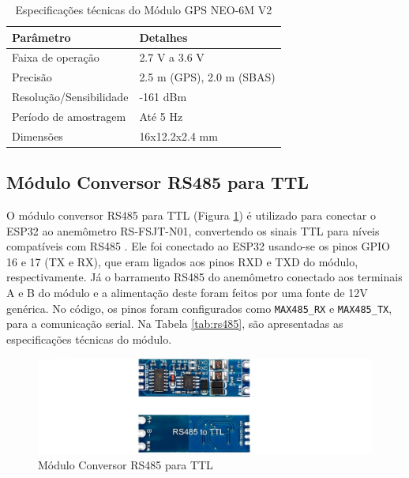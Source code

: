 \begin{table}[!htb]
  \caption{Especificações técnicas do Módulo GPS NEO-6M V2}
  \begin{tabularx}{\textwidth}{|X|X|} \hline
      \textbf{Parâmetro} & \textbf{Detalhes} \\ \hline
      Faixa de operação & 2.7 V a 3.6 V \\ \hline
      Precisão & 2.5 m (GPS), 2.0 m (SBAS) \\ \hline
      Resolução/Sensibilidade & -161 dBm \\ \hline
      Período de amostragem & Até 5 Hz \\ \hline
      Dimensões & 16x12.2x2.4 mm \\ \hline
  \end{tabularx}
  \label{tab:neo6}
\end{table}

\subsection{Módulo Conversor RS485 para TTL}

O módulo conversor RS485 para TTL (Figura \ref{figura:ttl_rs485}) é utilizado para conectar o ESP32 ao anemômetro RS-FSJT-N01, convertendo os sinais TTL para níveis compatíveis com RS485 \parencite{RS485TTL}. Ele foi conectado ao ESP32 usando-se os pinos GPIO 16 e 17 (TX e RX), que eram ligados aos pinos RXD e TXD do módulo, respectivamente. Já o barramento RS485 do anemômetro conectado aos terminais A e B do módulo e a alimentação deste foram feitos por uma fonte de 12V genérica. No código, os pinos foram configurados como \texttt{MAX485\_RX} e \texttt{MAX485\_TX}, para a comunicação serial. Na Tabela \ref{tab:rs485}, são apresentadas as especificações técnicas do módulo.

\begin{figure}[!htb] \centering
  \caption{Módulo Conversor RS485 para TTL} \label{figura:ttl_rs485}
  \begin{varwidth}{\linewidth}
    \includegraphics[width=16cm]{figuras/TTL_TO_RS485.png}
  \end{varwidth}
\end{figure}

